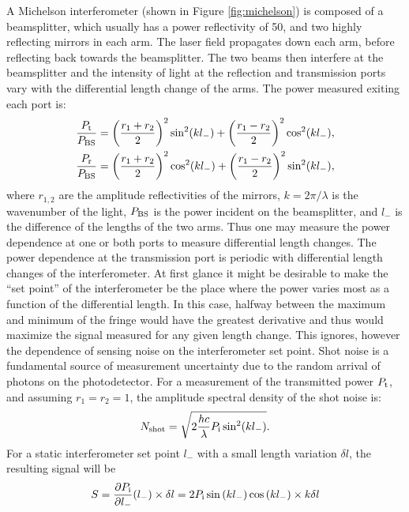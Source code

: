 A Michelson interferometer (shown in Figure \ref{fig:michelson}) is composed of a beamsplitter, which usually has a power reflectivity of 50\perc{}, and two highly reflecting mirrors in each arm. %
The laser field propagates down each arm, before reflecting back towards the beamsplitter. %
The two beams then interfere at the beamsplitter and the intensity of light at the reflection and transmission ports vary with the differential length change of the arms. %
The power measured exiting each port is:
\begin{align}
\frac{P_{\rm{t}}}{P_{\rm{BS}}} &= \left(\frac{r_1+r_2}{2}\right)^2\sin^2(kl_-)+\left(\frac{r_1-r_2}{2}\right)^2\cos^2(kl_-),\\
\frac{P_{\rm{r}}}{P_{\rm{BS}}} &= \left(\frac{r_1+r_2}{2}\right)^2\cos^2(kl_-)+\left(\frac{r_1-r_2}{2}\right)^2\sin^2(kl_-),
\end{align}
where $r_{1,2}$ are the amplitude reflectivities of the mirrors, $k=2\pi/\lambda$ is the wavenumber of the light, $P_{\rm{BS}}$ is the power incident on the beamsplitter, and $l_-$ is the difference of the lengths of the two arms. %
Thus one may measure the power dependence at one or both ports to measure differential length changes. %
The power dependence at the transmission port is periodic with differential length changes of the interferometer. %
At first glance it might be desirable to make the ``set point'' %
of the interferometer be the place where the power varies most as a function of the differential length. %
In this case, halfway between the maximum and minimum of the fringe would have the greatest derivative and thus would maximize the signal measured for any given length change. %
This ignores, however the dependence of sensing noise on the interferometer set point. %
Shot noise is a fundamental source of measurement uncertainty due to the random arrival of photons on the photodetector. %
For a measurement of the transmitted power $P_{\rm t}$, and assuming $r_1=r_2=1$, the amplitude spectral density of the shot noise is:
\begin{equation}
\label{eqn:michshotnoise}
N_{\rm{shot}}=\sqrt{2\frac{hc}{\lambda}P_{\rm i}\sin^2(kl_-)}.
\end{equation}
For a static interferometer set point $l_-$ with a small length variation $\delta l$, the resulting signal will be
\begin{equation}
S=\frac{\partial P_{\rm i}}{\partial l_-}(l_-) \times \delta l = 2P_{\rm i}\sin{(kl_-)}\cos{(kl_-)}\times k\delta l
\end{equation}
